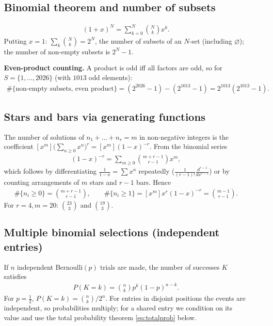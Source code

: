 \subsection{Binomial theorem and number of subsets}
\begin{align}
(1+x)^N=\sum_{k=0}^{N}\binom Nk x^k. \label{eq:binomial}
\end{align}
Putting $x=1$: $\sum_k\binom Nk=2^N$, the number of subsets of an $N$-set (including $\varnothing$);
the number of non-empty subsets is $2^N-1$.

\textbf{Even-product counting.} A product is odd iff all factors are odd, so for
$S=\{1,\dots,2026\}$ (with $1013$ odd elements):
\begin{align}
\#\{\text{non-empty subsets, even product}\}=(2^{2026}-1)-(2^{1013}-1)=2^{1013}(2^{1013}-1). \label{eq:evenprod}
\end{align}

\subsection{Stars and bars via generating functions}
The number of solutions of $n_1+\dots+n_r=m$ in non-negative integers is the coefficient
$[x^m]\big(\sum_{n\ge0}x^n\big)^r=[x^m](1-x)^{-r}$. From the binomial series
\begin{align}
(1-x)^{-r}=\sum_{m\ge0}\binom{m+r-1}{r-1}x^m, \label{eq:negbinom}
\end{align}
which follows by differentiating $\frac1{1-x}=\sum x^n$ repeatedly ($\tfrac1{(r-1)!}\tfrac{d^{r-1}}{dx^{r-1}}$)
or by counting arrangements of $m$ stars and $r-1$ bars. Hence
\begin{align}
\#\{n_i\ge0\}=\binom{m+r-1}{r-1},\qquad
\#\{n_i\ge1\}=[x^m]x^r(1-x)^{-r}=\binom{m-1}{r-1}. \label{eq:starsbars}
\end{align}
For $r=4,m=20$: $\binom{23}{3}$ and $\binom{19}{3}$.

\subsection{Multiple binomial selections (independent entries)}
If $n$ independent Bernoulli$(p)$ trials are made, the number of successes $K$ satisfies
\begin{align}
P(K=k)=\binom nk p^k(1-p)^{n-k}. \label{eq:binompmf}
\end{align}
For $p=\tfrac12$, $P(K=k)=\binom nk/2^n$. For entries in disjoint positions the events are independent, so
probabilities multiply; for a shared entry we condition on its value and use the total probability theorem
\eqref{eq:totalprob} below.

